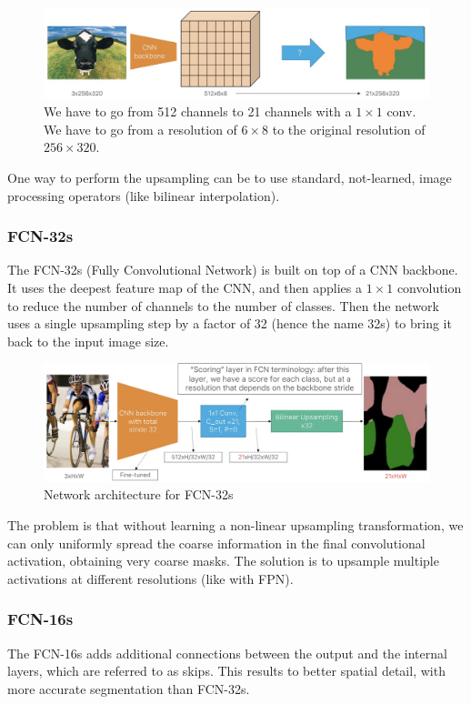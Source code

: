 \begin{figure}[htbp]
  \centering
  \includegraphics[width=0.7\linewidth]{./img/fcn_segmentation.jpg}
  \caption{We have to go from 512 channels to 21 channels with a $1\times 1$ conv. We have to go from a resolution of $6 \times 8$ to the original resolution of $256 \times 320$.}
\end{figure}

One way to perform the upsampling can be to use standard, not-learned, image processing operators (like bilinear interpolation).

\subsubsection{FCN-32s}
The FCN-32s (Fully Convolutional Network) is built on top of a CNN backbone.
It uses the deepest feature map of the CNN, and then applies a $1\times 1$ convolution to reduce the number of channels to the number of classes.
Then the network uses a single upsampling step by a factor of 32 (hence the name 32s) to bring it back to the input image size.

\begin{figure}[htbp]
  \centering
  \includegraphics[width=0.7\linewidth]{./img/fcn32.jpg}
  \caption{Network architecture for FCN-32s}
\end{figure}

The problem is that without learning a non-linear upsampling transformation, we can only uniformly spread the coarse information in the final convolutional activation, obtaining very coarse masks.
The solution is to upsample multiple activations at different resolutions (like with FPN).

\subsubsection{FCN-16s}
The FCN-16s adds additional connections between the output and the internal layers, which are referred to as skips.
This results to better spatial detail, with more accurate segmentation than FCN-32s.

